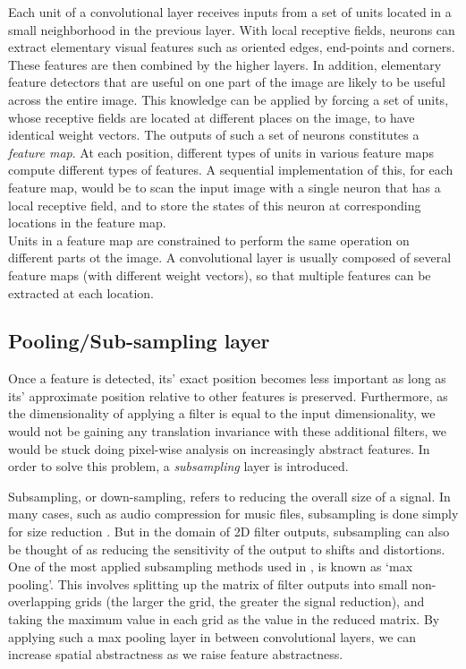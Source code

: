  Each unit of a convolutional layer receives inputs from a set of units located in a small neighborhood in the previous layer. With local receptive fields, neurons can extract elementary visual features such as oriented edges, end-points and corners. These features are then combined by the higher layers\cite{lecun2010convolutional}. In addition, elementary feature detectors that are useful on one part of the image are likely to be useful across the entire image. This knowledge can be applied by forcing a set of units, whose receptive fields are located at different places on the image, to have identical weight vectors\cite{williams1986learning}. The outputs of such a set of neurons constitutes a \textit{feature map}. At each position, different types of units in various feature maps compute different types of features. A sequential implementation of this, for each feature map, would be to scan the input image with a single neuron that has a local receptive field, and to store the states of this neuron at corresponding locations in the feature map\cite{lecun2010convolutional}. \\
\indent Units in a feature map are constrained to perform the same operation on different parts ot the image. A convolutional layer is usually composed of several feature maps (with different weight vectors), so that multiple features can be extracted at each location. 

\subsection{Pooling/Sub-sampling layer}
Once a feature is detected, its' exact position becomes less important as long as its' approximate position relative to other features is preserved. Furthermore, as the dimensionality of applying a filter is equal to the input dimensionality, we would not be gaining any translation invariance with these additional filters, we would be stuck doing pixel-wise analysis on increasingly abstract features. In order to solve this problem, a \textit{subsampling} layer is introduced.

 Subsampling, or down-sampling, refers to reducing the overall size of a signal. In many cases, such as audio compression for music files, subsampling is done simply for size reduction \cite{sub}. But in the domain of 2D filter outputs, subsampling  can also be thought of as reducing the sensitivity of the output to shifts and distortions. One of the most applied subsampling methods used in \cite{lecun1995comparison}, is known as `max pooling'. This involves splitting up the matrix of filter outputs into small non-overlapping grids (the larger the grid, the greater the signal reduction), and taking the maximum value in each grid as the value in the reduced matrix. By applying such a max pooling layer in between convolutional layers, we can increase spatial abstractness as we raise feature abstractness\cite{sub}.

